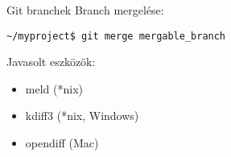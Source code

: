 
\begin{frame}[fragile]{Git branchek}
    \pause
    Branch mergelése:
\small\begin{verbatim}
~/myproject$ git merge mergable_branch
\end{verbatim}\normalsize

    \pause
    Javasolt eszközök:
    \begin{itemize}
        \item meld (*nix)
        \item kdiff3 (*nix, Windows)
        \item opendiff (Mac)
    \end{itemize}
\end{frame}

